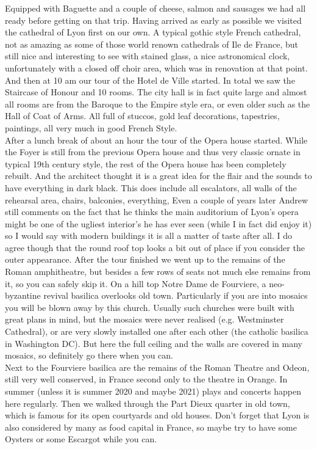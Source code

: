 Equipped with Baguette and a couple of cheese, salmon and sausages we had all ready before getting on that trip. Having arrived as early as possible we visited the cathedral of Lyon first on our own. A typical gothic style French cathedral, not as amazing as some of those world renown cathedrals of Ile de France, but still nice and interesting to see with stained glass, a nice astronomical clock, unfortunately with a closed off choir area, which was in renovation at that point. And then at 10 am our tour of the Hotel de Ville started. In total we saw the Staircase of Honour and 10 rooms. The city hall is in fact quite large and almost all rooms are from the Baroque to the Empire style era, or even older such as the Hall of Coat of Arms. All full of stuccos, gold leaf decorations, tapestries, paintings, all very much in good French Style. \\
After a lunch break of about an hour the tour of the Opera house started. While the Foyer is still from the previous Opera house and thus very classic ornate in typical 19th century style, the rest of the Opera house has been completely rebuilt. And the architect thought it is a great idea for the flair and the sounds to have everything in dark black. This does include all escalators, all walls of the rehearsal area, chairs, balconies, everything, Even a couple of years later Andrew still comments on the fact that he thinks the main auditorium of Lyon's opera might be one of the ugliest interior's he has ever seen (while I in fact did enjoy it) so I would say with modern buildings it is all a matter of taste after all. I do agree though that the round roof top looks a bit out of place if you consider the outer appearance. After the tour finished we went up to the remains of the Roman amphitheatre, but besides a few rows of seats not much else remains from it, so you can safely skip it. On a hill top Notre Dame de Fourviere, a neo-byzantine revival basilica overlooks old town. Particularly if you are into mosaics you will be blown away by this church. Usually such churches were built with great plans in mind, but the mosaics were never realised (e.g. Westminster Cathedral), or are very slowly installed one after each other (the catholic basilica in Washington DC). But here the full ceiling and the walls are covered in many mosaics, so definitely go there when you can. \\
Next to the Fourviere basilica are the remains of the Roman Theatre and Odeon, still very well conserved, in France second only to the theatre in Orange. In summer (unless it is summer 2020 and maybe 2021) plays and concerts happen here regularly. Then we walked through the Part Dieux quarter in old town, which is famous for its open courtyards and old houses. Don't forget that Lyon is also considered by many as food capital in France, so maybe try to have some Oysters or some Escargot while you can.\\

